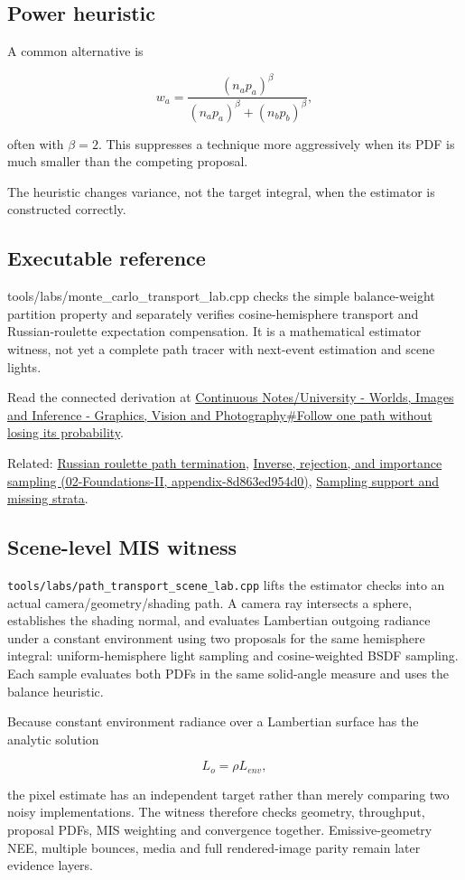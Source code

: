 \subsection{Power heuristic}\label{appendix-ca8898faf1a6-power-heuristic}

A common alternative is

\[
w_a=
\frac{(n_a p_a)^\beta}
{(n_a p_a)^\beta+(n_b p_b)^\beta},
\]

often with \(\beta=2\). This suppresses a technique more aggressively when its PDF is much smaller than the competing proposal.

The heuristic changes variance, not the target integral, when the estimator is constructed correctly.

\subsection{Executable reference}\label{appendix-ca8898faf1a6-executable-reference}

tools/labs/monte\_carlo\_transport\_lab.cpp checks the simple balance-weight partition property and separately verifies cosine-hemisphere transport and Russian-roulette expectation compensation. It is a mathematical estimator witness, not yet a complete path tracer with next-event estimation and scene lights.

Read the connected derivation at \hyperref[03-visual-computing-i-ch007-follow-one-path-without-losing-its-probability]{Continuous Notes/University - Worlds, Images and Inference - Graphics, Vision and Photography\#Follow one path without losing its probability}.

Related: \hyperref[appendix-7277c62d4599]{Russian roulette path termination}, \href{../02-Foundations-II/main.pdf\#nameddest=appendix-8d863ed954d0}{Inverse, rejection, and importance sampling (02-Foundations-II, appendix-8d863ed954d0)}, \hyperref[appendix-10308c3d753e]{Sampling support and missing strata}.

\subsection{Scene-level MIS witness}\label{appendix-ca8898faf1a6-scene-level-mis-witness}

\texttt{tools/labs/path\_transport\_scene\_lab.cpp} lifts the estimator checks into an actual camera/geometry/shading path. A camera ray intersects a sphere, establishes the shading normal, and evaluates Lambertian outgoing radiance under a constant environment using two proposals for the same hemisphere integral: uniform-hemisphere light sampling and cosine-weighted BSDF sampling. Each sample evaluates both PDFs in the same solid-angle measure and uses the balance heuristic.

Because constant environment radiance over a Lambertian surface has the analytic solution

\[
L_o = \rho L_{env},
\]

the pixel estimate has an independent target rather than merely comparing two noisy implementations. The witness therefore checks geometry, throughput, proposal PDFs, MIS weighting and convergence together. Emissive-geometry NEE, multiple bounces, media and full rendered-image parity remain later evidence layers.
